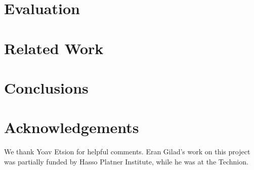 \documentclass[sigplan,10pt]{acmart}
\begin{document}
\section{Evaluation}
\label{sec:eval}


\section{Related Work}
\label{sec:related}


\section{Conclusions}
\label{sec:conclusions}


\section*{Acknowledgements}
We thank Yoav Etsion for helpful comments. Eran Gilad's work on this project was partially funded by Hasso Platner Institute, while he was at the Technion. 



\clearpage


\end{document}
